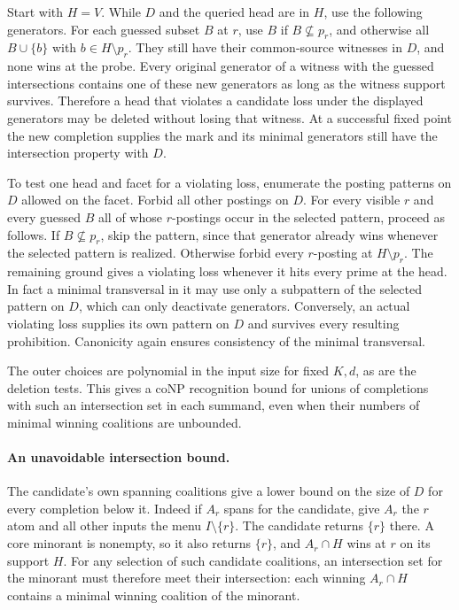 Start with $H=V$. While $D$ and the queried head are in
$H$, use the following generators. For each guessed subset
$B$ at $r$, use $B$ if $B\not\subseteq p_r$, and otherwise
all $B\cup\{b\}$ with $b\in H\setminus p_r$.
They still have their common-source witnesses in $D$, and
none wins at the probe. Every original generator of a
witness with the guessed intersections contains one of
these new generators as long as the witness support
survives. Therefore a head that violates a candidate loss
under the displayed generators may be deleted without
losing that witness. At a successful fixed point the new
completion supplies the mark and its minimal generators
still have the intersection property with $D$.

To test one head and facet for a violating loss, enumerate
the posting patterns on $D$ allowed on the facet. Forbid
all other postings on $D$. For every visible $r$ and every
guessed $B$ all of whose $r$-postings occur in the selected
pattern, proceed as follows. If $B\not\subseteq p_r$,
skip the pattern, since that generator already wins
whenever the selected pattern is realized. Otherwise
forbid every $r$-posting at $H\setminus p_r$. The remaining
ground gives a violating loss whenever it hits every prime
at the head. In fact a minimal transversal in it may use
only a subpattern of the selected pattern on $D$, which
can only deactivate generators. Conversely, an actual
violating loss supplies its own pattern on $D$ and survives
every resulting prohibition. Canonicity again ensures
consistency of the minimal transversal.

The outer choices are polynomial in the input size for
fixed $K,d$, as are the deletion tests. This gives a coNP
recognition bound for unions of completions with such an
intersection set in each summand, even when their numbers
of minimal winning coalitions are unbounded.

\paragraph{An unavoidable intersection bound.}
The candidate's own spanning coalitions give a lower bound
on the size of $D$ for every completion below it. Indeed if
$A_r$ spans for the candidate, give $A_r$ the $r$ atom and
all other inputs the menu $I\setminus\{r\}$. The candidate
returns $\{r\}$ there. A core minorant is nonempty, so it also
returns $\{r\}$, and $A_r\cap H$ wins at $r$ on its support
$H$. For any selection of such candidate coalitions, an
intersection set for the minorant must therefore meet their
intersection: each winning $A_r\cap H$ contains a minimal
winning coalition of the minorant.

